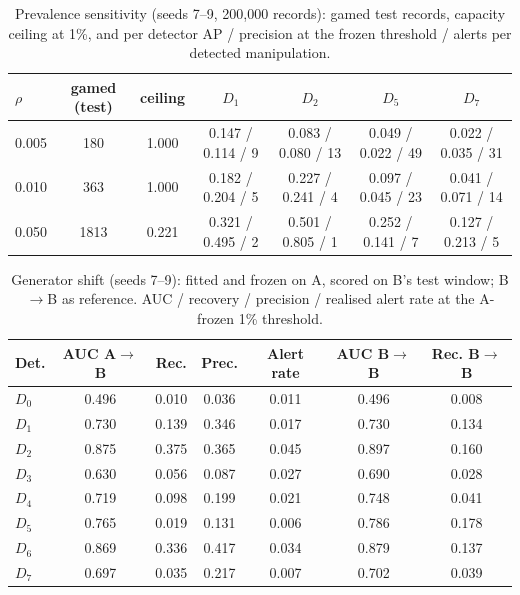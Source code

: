 \documentclass[conference]{IEEEtran}
\begin{document}
\begin{table}[t]\caption{Prevalence sensitivity (seeds 7--9, 200,000 records): gamed test records, capacity ceiling at 1\%, and per detector AP / precision at the frozen threshold / alerts per detected manipulation.}\centering\scriptsize\setlength{\tabcolsep}{3pt}
\begin{tabular}{@{}lcccccc@{}}\toprule
$\rho$ & gamed (test) & ceiling & $D_1$ & $D_2$ & $D_5$ & $D_7$ \\\midrule
0.005 & 180 & 1.000 & 0.147 / 0.114 / 9 & 0.083 / 0.080 / 13 & 0.049 / 0.022 / 49 & 0.022 / 0.035 / 31 \\
0.010 & 363 & 1.000 & 0.182 / 0.204 / 5 & 0.227 / 0.241 / 4 & 0.097 / 0.045 / 23 & 0.041 / 0.071 / 14 \\
0.050 & 1813 & 0.221 & 0.321 / 0.495 / 2 & 0.501 / 0.805 / 1 & 0.252 / 0.141 / 7 & 0.127 / 0.213 / 5 \\
\bottomrule\end{tabular}\end{table}
\begin{table}[t]\caption{Generator shift (seeds 7--9): fitted and frozen on A, scored on B's test window; B$\rightarrow$B as reference. AUC / recovery / precision / realised alert rate at the A-frozen 1\% threshold.}\centering\scriptsize\setlength{\tabcolsep}{3pt}
\begin{tabular}{@{}lcccc|cc@{}}\toprule
Det. & AUC A$\rightarrow$B & Rec. & Prec. & Alert rate & AUC B$\rightarrow$B & Rec. B$\rightarrow$B \\\midrule
$D_0$ & 0.496 & 0.010 & 0.036 & 0.011 & 0.496 & 0.008 \\
$D_1$ & 0.730 & 0.139 & 0.346 & 0.017 & 0.730 & 0.134 \\
$D_2$ & 0.875 & 0.375 & 0.365 & 0.045 & 0.897 & 0.160 \\
$D_3$ & 0.630 & 0.056 & 0.087 & 0.027 & 0.690 & 0.028 \\
$D_4$ & 0.719 & 0.098 & 0.199 & 0.021 & 0.748 & 0.041 \\
$D_5$ & 0.765 & 0.019 & 0.131 & 0.006 & 0.786 & 0.178 \\
$D_6$ & 0.869 & 0.336 & 0.417 & 0.034 & 0.879 & 0.137 \\
$D_7$ & 0.697 & 0.035 & 0.217 & 0.007 & 0.702 & 0.039 \\
\bottomrule\end{tabular}\end{table}
\end{document}
